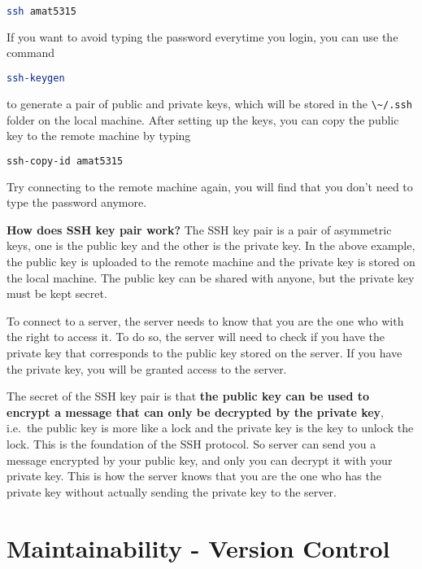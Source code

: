 \documentclass[
  notoc %
]{tufte-book}
\newcommand{\passthrough}[1]{#1}
\begin{document}
\begin{lstlisting}[language=bash]
ssh amat5315
\end{lstlisting}

If you want to avoid typing the password everytime you login, you can
use the command

\begin{lstlisting}[language=bash]
ssh-keygen
\end{lstlisting}

to generate a pair of public and private keys, which will be stored in
the \passthrough{\lstinline!\~/.ssh!} folder on the local machine. After
setting up the keys, you can copy the public key to the remote machine
by typing

\begin{lstlisting}[language=bash]
ssh-copy-id amat5315
\end{lstlisting}

Try connecting to the remote machine again, you will find that you don't
need to type the password anymore.

\textbf{How does SSH key pair work?} The SSH key pair is a pair of
asymmetric keys, one is the public key and the other is the private key.
In the above example, the public key is uploaded to the remote machine
and the private key is stored on the local machine. The public key can
be shared with anyone, but the private key must be kept secret.

To connect to a server, the server needs to know that you are the one
who with the right to access it. To do so, the server will need to check
if you have the private key that corresponds to the public key stored on
the server. If you have the private key, you will be granted access to
the server.

The secret of the SSH key pair is that \textbf{the public key can be
used to encrypt a message that can only be decrypted by the private
key}, i.e.~the public key is more like a lock and the private key is the
key to unlock the lock. This is the foundation of the SSH protocol. So
server can send you a message encrypted by your public key, and only you
can decrypt it with your private key. This is how the server knows that
you are the one who has the private key without actually sending the
private key to the server.

\hypertarget{sec:version-control}{%
\section{Maintainability - Version Control}\label{sec:version-control}}
\end{document}
